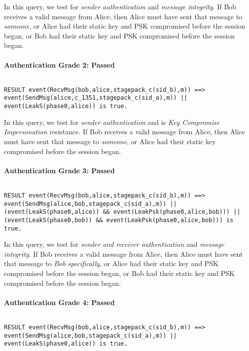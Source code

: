 In this query, we test for \emph{sender authentication} and \emph{message integrity}. If Bob receives a valid message from Alice, then Alice must have sent that message to \emph{someone}, or Alice had their static key and PSK compromised before the session began, or Bob had their static key and PSK compromised before the session began.


\paragraph{Authentication Grade 2: Passed}$ $
\begin{lstlisting}
RESULT event(RecvMsg(bob,alice,stagepack_c(sid_b),m)) ==> event(SendMsg(alice,c_1351,stagepack_c(sid_a),m)) || event(LeakS(phase0,alice)) is true.
\end{lstlisting}

In this query, we test for \emph{sender authentication} and is \emph{Key Compromise Impersonation} resistance. If Bob receives a valid message from Alice, then Alice must have sent that message to \emph{someone}, or Alice had their static key compromised before the session began.


\paragraph{Authentication Grade 3: Passed}$ $
\begin{lstlisting}
RESULT event(RecvMsg(bob,alice,stagepack_c(sid_b),m)) ==> event(SendMsg(alice,bob,stagepack_c(sid_a),m)) || (event(LeakS(phase0,alice)) && event(LeakPsk(phase0,alice,bob))) || (event(LeakS(phase0,bob)) && event(LeakPsk(phase0,alice,bob))) is true.
\end{lstlisting}

In this query, we test for \emph{sender and receiver authentication} and \emph{message integrity}. If Bob receives a valid message from Alice, then Alice must have sent that message to \emph{Bob specifically}, or Alice had their static key and PSK compromised before the session began, or Bob had their static key and PSK compromised before the session began.


\paragraph{Authentication Grade 4: Passed}$ $
\begin{lstlisting}
RESULT event(RecvMsg(bob,alice,stagepack_c(sid_b),m)) ==> event(SendMsg(alice,bob,stagepack_c(sid_a),m)) || event(LeakS(phase0,alice)) is true.
\end{lstlisting}


